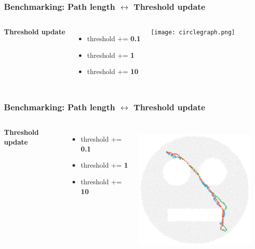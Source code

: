 \documentclass{beamer}
\begin{document}
\begin{frame}
\frametitle{Benchmarking: Path length $\leftrightarrow$ Threshold update}
\begin{columns}[c] %
\textbf{Threshold update}
\begin{itemize}
\item \textcolor{0.1}{threshold += \textbf{0.1}}
\item \textcolor{1}{threshold += \textbf{1}}
\item \textcolor{10}{threshold += \textbf{10}}
\end{itemize}

\begin{center}
	\texttt{[image: circlegraph.png]}
\end{center}
\end{columns}
\end{frame}


\begin{frame}
\frametitle{Benchmarking: Path length $\leftrightarrow$ Threshold update}
\begin{columns}[c] %
\textbf{Threshold update}
\begin{itemize}
\item \textcolor{0.1}{threshold += \textbf{0.1}}
\item \textcolor{1}{threshold += \textbf{1}}
\item \textcolor{10}{threshold += \textbf{10}}
\end{itemize}

\begin{center}
	\includegraphics[height=190pt]{smileygraph.png}
\end{center}
\end{columns}
\end{frame}
\end{document}
